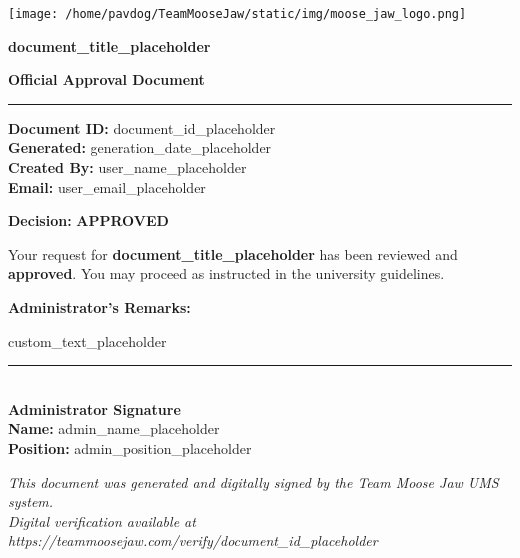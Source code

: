 \documentclass[12pt]{article}
\newcommand{\documentid}{document_id_placeholder}
\newcommand{\documenttitle}{document_title_placeholder}
\newcommand{\username}{user_name_placeholder}
\newcommand{\useremail}{user_email_placeholder}
\newcommand{\generationdate}{generation_date_placeholder}
\newcommand{\customtext}{custom_text_placeholder}
\newcommand{\adminname}{admin_name_placeholder}
\newcommand{\adminposition}{admin_position_placeholder}
\begin{document}
\begin{center}
    \texttt{[image: /home/pavdog/TeamMooseJaw/static/img/moose\_jaw\_logo.png]}
    \vspace{1cm}

    {\Large\textbf{\documenttitle}}
    \vspace{0.5cm}

    {\large\textbf{Official Approval Document}}
    \vspace{1cm}
\end{center}


\noindent\rule{\linewidth}{1pt}
\vspace{0.5cm}

\noindent\textbf{Document ID:} \documentid \\
\noindent\textbf{Generated:} \generationdate \\
\noindent\textbf{Created By:} \username \\
\noindent\textbf{Email:} \useremail

\vspace{1cm}

\noindent\textbf{Decision:} \textbf{APPROVED}

\vspace{0.5cm}

\noindent Your request for \textbf{\documenttitle} has been reviewed and \textbf{approved}. You may proceed as instructed in the university guidelines.

\vspace{1cm}

\noindent\textbf{Administrator's Remarks:} \\
\parbox{0.9\textwidth}{
\customtext
}

\vspace{2cm}

\noindent\rule{7cm}{0.5pt} \\
\noindent\textbf{Administrator Signature} \\
\noindent\textbf{Name:} \adminname \\
\noindent\textbf{Position:} \adminposition

\vspace{1cm}

\begin{center}
    {\color{moosejawblue}\textit{This document was generated and digitally signed by the Team Moose Jaw UMS system.}}\\
    {\small\textit{Digital verification available at https://teammoosejaw.com/verify/\documentid}}
\end{center}
\end{document}

